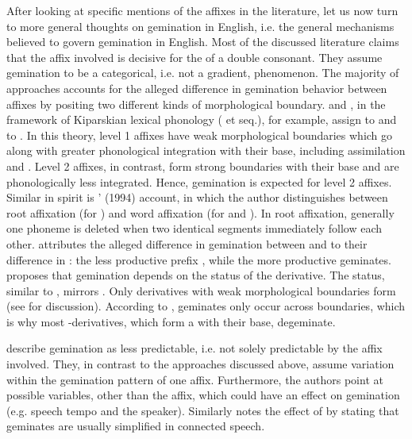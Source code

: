 After looking at specific mentions of the affixes in the literature, let us now turn to more general thoughts on gemination in English, i.e. the general mechanisms believed to govern gemination in English. 
Most of the discussed literature claims that the affix involved is decisive for the  of a double consonant. They assume gemination to be a categorical, i.e. not a gradient, phenomenon. The majority of approaches accounts for the alleged difference in gemination behavior between affixes by positing two different kinds of morphological boundary. \citet[18]{Mohanan.1986} and \citet[119ff.]{Borowsky.1986}, in the framework of Kiparskian lexical phonology (\citealt{Kiparsky.1982} et seq.), for example, assign  to  and  to . In this theory, {level 1} affixes have weak morphological boundaries  which go along with greater phonological integration with their base, including assimilation and . Level 2 affixes, in contrast, form strong boundaries with their base and are phonologically less integrated. Hence, gemination is expected for {level 2} affixes. Similar in spirit is \citeauthor{Harris.1994}' (1994) account, in which the author distinguishes between root {affixation} (for ) and word {affixation} (for  and ). In root {affixation}, generally one phoneme is deleted when two identical segments immediately follow each other. 
\cite{CohenGoldberg.2013} attributes the alleged difference in gemination between  and  to their difference in  : the less productive prefix  , while the more productive  geminates. 
\citet[354]{Giegerich.2012} proposes that gemination depends on the  status of the derivative. The  status, similar to , mirrors . Only derivatives with weak morphological boundaries form  (see  for discussion). According to \cite{Giegerich.2012}, geminates only occur across  boundaries, which is why most -derivatives, which form a  with their base, {degeminate}.

\citet[169]{Bauer.2013} describe gemination as less predictable, i.e.  not solely  predictable by the affix involved. They, in contrast to the approaches discussed above, assume variation within the gemination pattern of one affix. Furthermore, the authors point at possible variables, other than the affix, which could have an effect on gemination (e.g. speech tempo and the speaker). Similarly \citet[191, 288]{Giegerich.1992} notes the effect of  by stating that geminates are usually simplified in connected speech.
 
